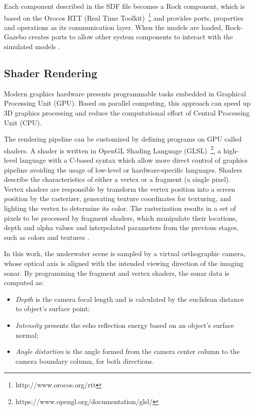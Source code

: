 \documentclass[final,5p,times]{elsarticle}
\begin{document}
Each component described in the SDF file becomes a Rock component, which is based on the Orocos RTT (Real Time Toolkit)~\footnote{http://www.orocos.org/rtt} and provides ports, properties and operations as its communication layer. When the models are loaded, Rock-Gazebo creates ports to allow other system components to interact with the simulated models \cite{cerqueira2016}.


\subsection{Shader Rendering}
\label{dev:shader}

Modern graphics hardware presents programmable tasks embedded in Graphical Processing Unit (GPU). Based on parallel computing, this approach can speed up 3D graphics processing and reduce the computational effort of Central Processing Unit (CPU).

The rendering pipeline can be customized by defining programs on GPU called shaders. A shader is written in OpenGL Shading Language (GLSL)~\footnote{https://www.opengl.org/documentation/glsl/}, a high-level language with a C-based syntax which allow more direct control of graphics pipeline avoiding the usage of low-level or hardware-specific languages. Shaders describe the characteristics of either a vertex or a fragment (a single pixel). Vertex shaders are responsible by transform the vertex position into a screen position by the rasterizer, generating texture coordinates for texturing, and lighting the vertex to determine its color. The rasterization results in a set of pixels to be processed by fragment shaders, which manipulate their locations, depth and alpha values and interpolated parameters from the previous stages, such as colors and textures \cite{fernando2003}.

In this work, the underwater scene is sampled by a virtual orthographic camera, whose optical axis is aligned with the intended viewing direction of the imaging sonar. By programming the fragment and vertex shaders, the sonar data is computed as:

\begin{itemize}[(a)]
    \item \textit{Depth} is the camera focal length and is calculated by the euclidean distance to object's surface point;
    \item \textit{Intensity} presents the echo reflection energy based on an object's surface normal;
    \item \textit{Angle distortion} is the angle formed from the camera center column to the camera boundary column, for both directions.
\end{itemize}
\end{document}
